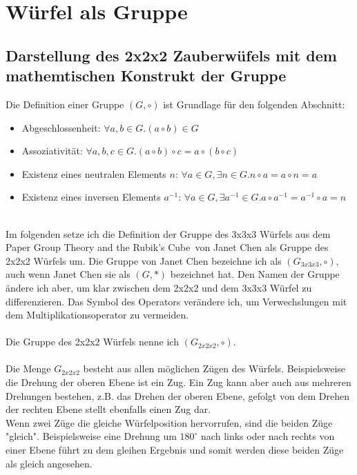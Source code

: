 \documentclass[12pt,a4paper, usenames, dvipsnames]{article}
\begin{document}
\section{Würfel als Gruppe}

\subsection*{Darstellung des 2x2x2 Zauberwüfels mit dem mathemtischen Konstrukt der Gruppe}

Die Definition einer Gruppe $(G, \circ)$ ist Grundlage für den folgenden Abschnitt:
\begin{itemize}
\item Abgeschlossenheit: $\forall a,b \in G.(a \circ b) \in G $
\item Assoziativität: $\forall a,b,c \in G.(a \circ b) \circ c = a \circ (b \circ c)$
\item Existenz eines neutralen Elements $n$: $\forall a \in G, \exists n \in G.n \circ a = a \circ n = a$ 
\item Existenz eines inversen Elements $a^{-1}$: $\forall a \in G, \exists a^{-1} \in G. a \circ a^{-1} = a^{-1} \circ a = n$ 
\end{itemize}
\ \\
Im folgenden setze ich die Definition der Gruppe des 3x3x3 Würfels aus dem Paper \glqq Group Theory and the Rubik's Cube\grqq \  von Janet Chen \cite{JC} als Gruppe des 2x2x2 Würfels um. Die Gruppe von Janet Chen bezeichne ich als $(G_{3x3x3}, \circ)$, auch wenn Janet Chen sie als $(G, *)$ bezeichnet hat. Den Namen der Gruppe ändere ich aber, um klar zwischen dem 2x2x2 und dem 3x3x3 Würfel zu differenzieren. Das Symbol des Operators verändere ich, um Verwechslungen mit dem Multiplikationsoperator zu vermeiden. \\
\\ 
Die Gruppe des 2x2x2 Würfels nenne ich $(G_{2x2x2}, \circ)$. \\
\\
Die Menge $G_{2x2x2}$ besteht aus allen möglichen Zügen des Würfels. Beispielsweise die Drehung der oberen Ebene ist ein Zug. Ein Zug kann aber auch aus mehreren Drehungen bestehen, z.B. das Drehen der oberen Ebene, gefolgt von dem Drehen der rechten Ebene stellt ebenfalls einen Zug dar. \\
Wenn zwei Züge die gleiche Würfelposition hervorrufen, sind die beiden Züge "gleich". Beispielsweise eine Drehung um $180^{\circ}$ nach links oder nach rechts von einer Ebene führt zu dem gleihen Ergebnis und somit werden diese beiden Züge als gleich angesehen. \\
\end{document}
